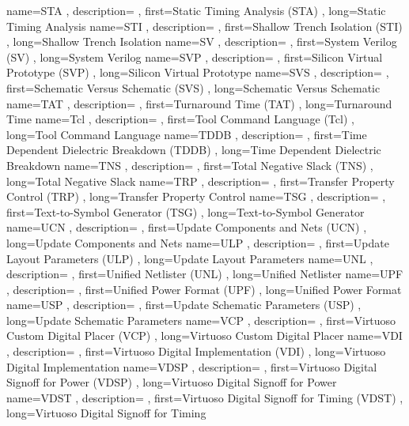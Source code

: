 { name={STA}
, description={}
, first={Static Timing Analysis (STA)}
, long={Static Timing Analysis}
}
{ name={STI}
, description={}
, first={Shallow Trench Isolation (STI)}
, long={Shallow Trench Isolation}
}
{ name={SV}
, description={}
, first={System Verilog (SV)}
, long={System Verilog}
}
{ name={SVP}
, description={}
, first={Silicon Virtual Prototype (SVP)}
, long={Silicon Virtual Prototype}
}
{ name={SVS}
, description={}
, first={Schematic Versus Schematic (SVS)}
, long={Schematic Versus Schematic}
}
{ name={TAT}
, description={}
, first={Turnaround Time (TAT)}
, long={Turnaround Time}
}
{ name={Tcl}
, description={}
, first={Tool Command Language (Tcl)}
, long={Tool Command Language}
}
{ name={TDDB}
, description={}
, first={Time Dependent Dielectric Breakdown (TDDB)}
, long={Time Dependent Dielectric Breakdown}
}
{ name={TNS}
, description={}
, first={Total Negative Slack (TNS)}
, long={Total Negative Slack}
}
{ name={TRP}
, description={}
, first={Transfer Property Control (TRP)}
, long={Transfer Property Control}
}
{ name={TSG}
, description={}
, first={Text-to-Symbol Generator (TSG)}
, long={Text-to-Symbol Generator}
}
{ name={UCN}
, description={}
, first={Update Components and Nets (UCN)}
, long={Update Components and Nets}
}
{ name={ULP}
, description={}
, first={Update Layout Parameters (ULP)}
, long={Update Layout Parameters}
}
{ name={UNL}
, description={}
, first={Unified Netlister (UNL)}
, long={Unified Netlister}
}
{ name={UPF}
, description={}
, first={Unified Power Format (UPF)}
, long={Unified Power Format}
}
{ name={USP}
, description={}
, first={Update Schematic Parameters (USP)}
, long={Update Schematic Parameters}
}
{ name={VCP}
, description={}
, first={Virtuoso Custom Digital Placer (VCP)}
, long={Virtuoso Custom Digital Placer}
}
{ name={VDI}
, description={}
, first={Virtuoso Digital Implementation (VDI)}
, long={Virtuoso Digital Implementation}
}
{ name={VDSP}
, description={}
, first={Virtuoso Digital Signoff for Power (VDSP)}
, long={Virtuoso Digital Signoff for Power}
}
{ name={VDST}
, description={}
, first={Virtuoso Digital Signoff for Timing (VDST)}
, long={Virtuoso Digital Signoff for Timing}
}

